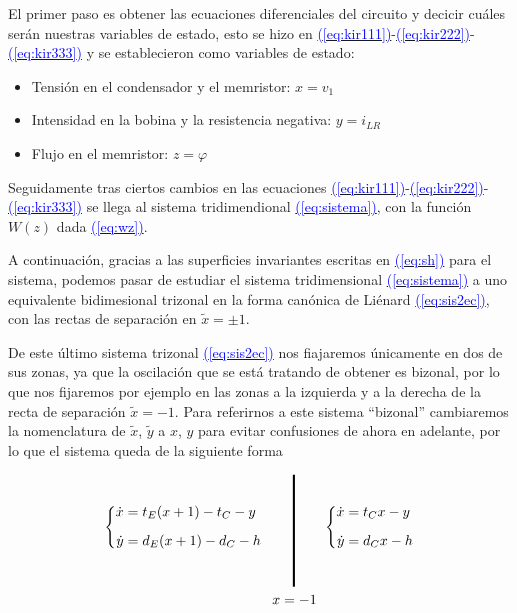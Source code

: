 \documentclass[12pt,a4paper]{report} %
\newcommand{\eref}[1]{\hyperref[#1]{\textcolor{blue}{(\ref*{#1})}}}
\newcommand{\eref}[1]{\hyperref[#1]{\textcolor{blue}{\textit{(\ref*{#1})}}}}
\begin{document}
	\vspace{0.5cm} El primer paso es obtener las ecuaciones diferenciales del circuito y decicir cuáles serán nuestras variables de estado, esto se hizo en \eref{eq:kir111}-\eref{eq:kir222}-\eref{eq:kir333} y se establecieron como variables de estado:
	
	\begin{itemize}
		\item Tensión en el condensador y el memristor: $x=v_1$
		\item Intensidad en la bobina y la resistencia negativa: $y=i_{LR}$
		\item Flujo en el memristor: $z=\varphi$
	\end{itemize}
	
	\vspace{0.5cm} Seguidamente tras ciertos cambios en las ecuaciones \eref{eq:kir111}-\eref{eq:kir222}-\eref{eq:kir333} se llega al sistema tridimendional \eref{eq:sistema}, con la función $W(z)$ dada \eref{eq:wz}.
	
	\vspace{0.5cm} A continuación, gracias a las superficies invariantes escritas en \eref{eq:sh} para el sistema, podemos pasar de estudiar el sistema tridimensional \eref{eq:sistema} a uno equivalente bidimesional trizonal en la forma canónica de Liénard \eref{eq:sis2ec}, con las rectas de separación en $\tilde{x}=\pm1$.
	
	\vspace{0.5cm} De este último sistema trizonal \eref{eq:sis2ec} nos fiajaremos únicamente en dos de sus zonas, ya que la oscilación que se está tratando de obtener es bizonal, por lo que nos fijaremos por ejemplo en las zonas a la izquierda y a la derecha de la recta de separación $\tilde{x}=-1$. Para referirnos a este sistema ``bizonal'' cambiaremos la nomenclatura de $\tilde{x}$, $\tilde{y}$ a $x$, $y$ para evitar confusiones de ahora en adelante, por lo que el sistema queda de la siguiente forma
	
	\begin{equation}
		\label{eq:sisbiz}
		\begin{gathered}
			\left\{
			\begin{aligned}
				\dot{x}&=t_E(x+1)-t_C-y
				\\[2mm]
				\dot{y}&=d_E(x+1)-d_C-h
			\end{aligned}
			\right. \qquad 
			\rule[-40pt]{1.5pt}{80pt} \qquad 
			\left\{
			\begin{aligned}
				\dot{x}&=t_Cx-y
				\\[2mm]
				\dot{y}&=d_Cx-h
			\end{aligned}
			\right. \\ \quad\qquad\qquad x=-1
		\end{gathered}
	\end{equation}\smallskip
	
\end{document}
